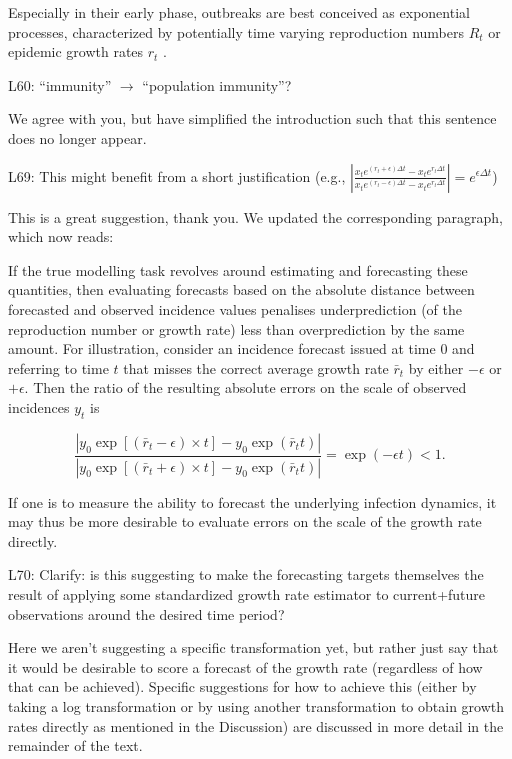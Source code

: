 \documentclass{article}
\newcommand{\black}{\color{black}}
\newcommand{\blue}{\color{blue}}
\newcommand{\indented}{\setlength{\leftskip}{1cm}}
\newcommand{\notindented}{\setlength{\leftskip}{0cm}}
\begin{document}
\indented

Especially in their early phase, outbreaks are best conceived as exponential processes, characterized by potentially time varying reproduction numbers $R_t$ \citep{gosticPracticalConsiderationsMeasuring2020} or epidemic growth rates $r_t$ \citep{dushoffSpeedStrengthEpidemic2021}.

\notindented

\blue
L60: “immunity” $\xrightarrow{}$ “population immunity”?

\black
We agree with you, but have simplified the introduction such that this sentence does no longer appear. 

\blue
L69: This might benefit from a short justification (e.g.,
$\left| \frac{x_t e^{(r_t + \epsilon) \Delta t} - x_t e^{r_t \Delta t}}{x_t e^{(r_t - \epsilon) \Delta t} - x_t e^{r_t \Delta t}} \right| = e^{\epsilon\Delta t}$)

\black
This is a great suggestion, thank you. We updated the corresponding paragraph, which now reads: 

\indented
If the true modelling task revolves around estimating and forecasting these quantities, then evaluating forecasts based on the absolute distance between forecasted and observed incidence values penalises underprediction (of the reproduction number or growth rate) less than overprediction by the same amount. For illustration, consider an incidence forecast issued at time 0 and referring to time $t$ that misses the correct average growth rate $\bar{r}_t$ by either $-\epsilon$ or $+\epsilon$. Then the ratio of the resulting absolute errors on the scale of observed incidences $y_{t}$ is

\begin{equation}
\frac{\left|y_0 \exp[(\bar{r}_t - \epsilon) \times t] - y_0 \exp(\bar{r}_t t)\right|}{\left| y_0 \exp[(\bar{r}_t + \epsilon) \times t] - y_0 \exp(\bar{r}_t t) \right|} = \exp(-\epsilon t) < 1.
\end{equation}

If one is to measure the ability to forecast the underlying infection dynamics, it may thus be more desirable to evaluate errors on the scale of the growth rate directly.

\notindented
\blue
L70: Clarify: is this suggesting to make the forecasting targets themselves the result of applying some standardized growth rate estimator to current+future observations around the desired time period?

\black 
Here we aren't suggesting a specific transformation yet, but rather just say that it would be desirable to score a forecast of the growth rate (regardless of how that can be achieved). Specific suggestions for how to achieve this (either by taking a log transformation or by using another transformation to obtain growth rates directly as mentioned in the Discussion) are discussed in more detail in the remainder of the text. 
\end{document}
